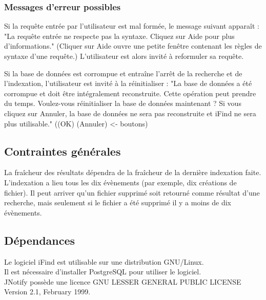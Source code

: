 

\subsubsection{Messages d'erreur possibles}
Si la requête entrée par l'utilisateur est mal formée, le message suivant apparaît :
"La requête entrée ne respecte pas la syntaxe. Cliquez sur Aide pour plus d'informations."
(Cliquer sur Aide ouvre une petite fenêtre contenant les règles de syntaxe d'une requête.)
L'utilisateur est alors invité à reformuler sa requête.

Si la base de données est corrompue et entraîne l'arrêt de la recherche et de l'indexation, l'utilisateur est invité à la réinitialiser :
"La base de données a été corrompue et doit être intégralement reconstruite. 
Cette opération peut prendre du temps. Voulez-vous réinitialiser la base de données maintenant ?
Si vous cliquez sur Annuler, la base de données ne sera pas reconstruite et iFind ne sera plus utilisable."
((OK) (Annuler) <- boutons)

\subsection{Contraintes générales}
La fraîcheur des résultats dépendra de la fraîcheur de la dernière indexation faite.\\
L'indexation a lieu tous les dix évènements (par exemple, dix créations de fichier).
Il peut arriver qu'un fichier supprimé soit retourné comme résultat d'une recherche, 
mais seulement si le fichier a été supprimé il y a moins de dix évènements.

\subsection{Dépendances}
Le logiciel iFind est utilisable sur une distribution GNU/Linux.\\
Il est nécessaire d'installer PostgreSQL pour utiliser le logiciel.\\
JNotify possède une licence GNU LESSER GENERAL PUBLIC LICENSE Version 2.1, February 1999.
\newpage


